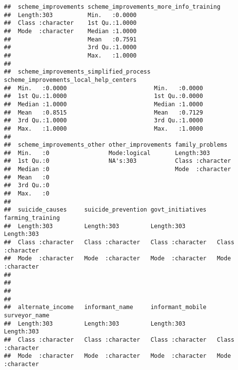 \documentclass[
]{article}
\begin{document}
\begin{verbatim}
##  scheme_improvements scheme_improvements_more_info_training
##  Length:303          Min.   :0.0000                        
##  Class :character    1st Qu.:1.0000                        
##  Mode  :character    Median :1.0000                        
##                      Mean   :0.7591                        
##                      3rd Qu.:1.0000                        
##                      Max.   :1.0000                        
##                                                            
##  scheme_improvements_simplified_process scheme_improvements_local_help_centers
##  Min.   :0.0000                         Min.   :0.0000                        
##  1st Qu.:1.0000                         1st Qu.:0.0000                        
##  Median :1.0000                         Median :1.0000                        
##  Mean   :0.8515                         Mean   :0.7129                        
##  3rd Qu.:1.0000                         3rd Qu.:1.0000                        
##  Max.   :1.0000                         Max.   :1.0000                        
##                                                                               
##  scheme_improvements_other other_improvements family_problems   
##  Min.   :0                 Mode:logical       Length:303        
##  1st Qu.:0                 NA's:303           Class :character  
##  Median :0                                    Mode  :character  
##  Mean   :0                                                      
##  3rd Qu.:0                                                      
##  Max.   :0                                                      
##                                                                 
##  suicide_causes     suicide_prevention govt_initiatives   farming_training  
##  Length:303         Length:303         Length:303         Length:303        
##  Class :character   Class :character   Class :character   Class :character  
##  Mode  :character   Mode  :character   Mode  :character   Mode  :character  
##                                                                             
##                                                                             
##                                                                             
##                                                                             
##  alternate_income   informant_name     informant_mobile   surveyor_name     
##  Length:303         Length:303         Length:303         Length:303        
##  Class :character   Class :character   Class :character   Class :character  
##  Mode  :character   Mode  :character   Mode  :character   Mode  :character  

\end{verbatim}
\end{document}

